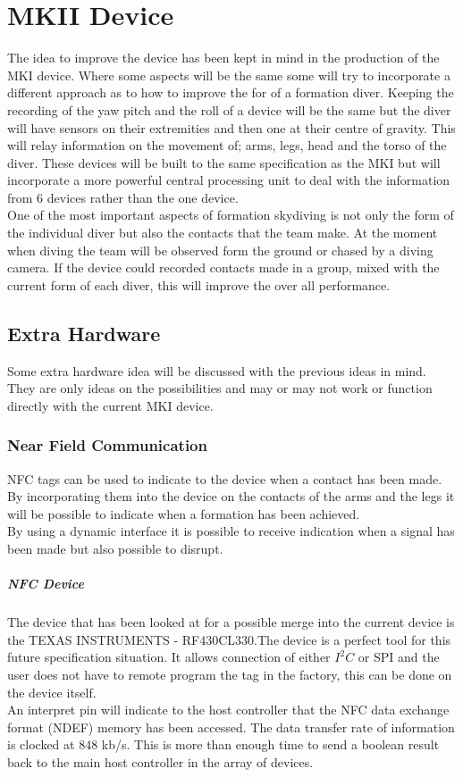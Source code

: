 \documentclass{report}
\begin{document}
  
\section{MKII Device}

The idea to improve the device has been kept in mind in the production of the MKI device. Where some aspects will be the same some will try to incorporate a different approach as to how to improve the for of a formation diver. Keeping the recording of the yaw pitch and the roll of a device will be the same but the diver will have sensors on their extremities and then one at their centre of gravity. This will relay information on the movement of; arms, legs, head and the torso of the diver. These devices will be built to the same specification as the MKI but will incorporate a more powerful central processing unit to deal with the information from 6 devices rather than the one device.\\
One of the most important aspects of formation skydiving is not only the form of the individual diver but also the contacts that the team make. At the moment when diving the team will be observed form the ground or chased by a diving camera. If the device could recorded contacts made in a group, mixed with the current form of each diver, this will improve the over all performance.\\

\subsection{Extra Hardware}

Some extra hardware idea will be discussed with the previous ideas in mind. They are only ideas on the possibilities and may or may not work or function directly with the current MKI device.\\

\subsubsection{Near Field Communication}
NFC tags can be used to indicate to the device when a contact has been made. By incorporating them into the device on the contacts of the arms and the legs it will be possible to indicate when a formation has been achieved.\\
By using a dynamic interface it is possible to receive indication when a signal has been made but also possible to disrupt. 
\subparagraph{NFC Device}
The device that has been looked at for a possible merge into the current device is the TEXAS INSTRUMENTS - RF430CL330.The device is a perfect tool for this future specification situation. It allows connection of either $I^2C$  or SPI and the user does not have to remote program the tag in the factory, this can be done on the device itself.\\
An interpret pin will indicate to the host controller that the NFC data exchange format (NDEF) memory has been accessed. The data transfer rate of information is clocked at 848 kb/s. This is more than enough time to send a boolean result back to the main host controller in the array of devices. \\
\end{document}
